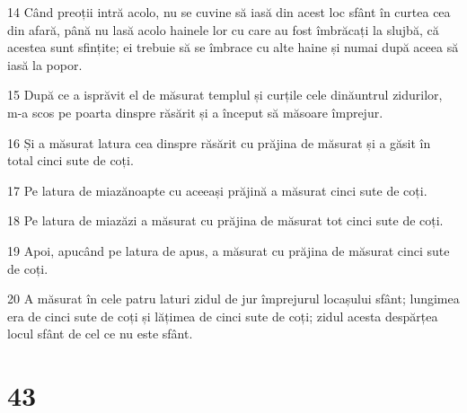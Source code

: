 \par 14 Când preoții intră acolo, nu se cuvine să iasă din acest loc sfânt în curtea cea din afară, până nu lasă acolo hainele lor cu care au fost îmbrăcați la slujbă, că acestea sunt sfințite; ei trebuie să se îmbrace cu alte haine și numai după aceea să iasă la popor.
\par 15 După ce a isprăvit el de măsurat templul și curțile cele dinăuntrul zidurilor, m-a scos pe poarta dinspre răsărit și a început să măsoare împrejur.
\par 16 Și a măsurat latura cea dinspre răsărit cu prăjina de măsurat și a găsit în total cinci sute de coți.
\par 17 Pe latura de miazănoapte cu aceeași prăjină a măsurat cinci sute de coți.
\par 18 Pe latura de miazăzi a măsurat cu prăjina de măsurat tot cinci sute de coți.
\par 19 Apoi, apucând pe latura de apus, a măsurat cu prăjina de măsurat cinci sute de coți.
\par 20 A măsurat în cele patru laturi zidul de jur împrejurul locașului sfânt; lungimea era de cinci sute de coți și lățimea de cinci sute de coți; zidul acesta despărțea locul sfânt de cel ce nu este sfânt.

\chapter{43}

